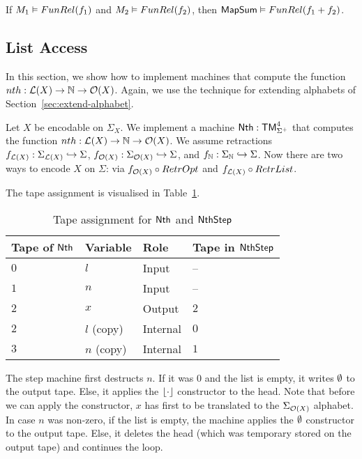 \begin{lemma}
  \label{lem:MapSum_Computes}
  If $M_1 \mathrel{\vDash} FunRel(f_1)$ and $M_2 \mathrel{\vDash} FunRel(f_2)$, then $\mathsf{MapSum} \mathrel{\vDash} FunRel(f_1+f_2)$.
\end{lemma}


\subsection{List Access}
\label{sec:Nth}
%

In this section, we show how to implement machines that compute the function $nth : \mathcal{L}(X) \rightarrow \mathbb{N} \rightarrow \mathcal{O}(X)$.  Again, we use the technique
for extending alphabets of Section~\ref{sec:extend-alphabet}.

Let $X$ be encodable on $\Sigma_X$.  We implement a machine $\mathsf{Nth} : \mathsf{TM}_{\Sigma^+}^4$ that computes the function
$nth : \mathcal{L}(X) \rightarrow \mathbb{N} \rightarrow \mathcal{O}(X)$.  We assume retractions $f_{\mathcal{L}(X)} : \Sigma_{\mathcal{L}(X)} \hookrightarrow \Sigma$,
$f_{\mathcal{O}(X)} : \Sigma_{\mathcal{O}(X)} \hookrightarrow \Sigma$, and $f_{\mathbb{N}} : \Sigma_{\mathbb{N}} \hookrightarrow \Sigma$.  Now there are two ways to encode
$X$ on $\Sigma$: via $f_{\mathcal{O}(X)} \circ RetrOpt$ and $f_{\mathcal{L}(X)} \circ RetrList$.

The tape assignment is visualised in Table~\ref{tab:tapes-Nth}.

\begin{table}[!htb]
  \centering
  \begin{tabular}{l|l|l|l}
    Tape of $\mathsf{Nth}$ & Variable & Role & Tape in $\mathsf{NthStep}$ \\ \hline
    $0$ & $l$        & Input    & --  \\
    $1$ & $n$        & Input    & --  \\
    $2$ & $x$        & Output   & $2$ \\
    $2$ & $l$ (copy) & Internal & $0$ \\
    $3$ & $n$ (copy) & Internal & $1$ \\
  \end{tabular}
  \caption{Tape assignment for $\mathsf{Nth}$ and $\mathsf{NthStep}$}
  \label{tab:tapes-Nth}
\end{table}


The step machine first destructs $n$.  If it was $0$ and the list is empty, it writes $\emptyset$ to the output tape.  Else, it applies the $\left\lfloor {\cdot} \right\rfloor$
constructor to the head.  Note that before we can apply the constructor, $x$ has first to be translated to the $\Sigma_{\mathcal{O}(X)}$ alphabet.  In
case $n$ was non-zero, if the list is empty, the machine applies the $\emptyset$ constructor to the output tape.  Else, it deletes the head (which was
temporary stored on the output tape) and continues the loop.

